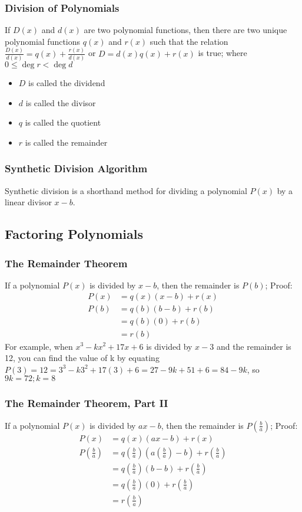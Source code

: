 \documentclass{article}
\begin{document}
	\subsubsection{Division of Polynomials}
	If $D(x)$ and $d(x)$ are two polynomial functions, then there are two unique polynomial functions $q(x)$ and $r(x)$ such that the relation $\frac{D(x)}{d(x)}=q(x)+\frac{r(x)}{d(x)}$ or $D=d(x)q(x)+r(x)$ is true; where $0\leq\deg r<\deg d$
	\begin{itemize}
		\item $D$ is called the dividend
		\item $d$ is called the divisor
		\item $q$ is called the quotient
		\item $r$ is called the remainder
	\end{itemize}
	\subsubsection{Synthetic Division Algorithm}
	Synthetic division is a shorthand method for dividing a polynomial $P(x)$ by a linear divisor $x-b$.
	\subsection{Factoring Polynomials}
	\subsubsection{The Remainder Theorem}
	If a polynomial $P(x)$ is divided by $x-b$, then the remainder is $P(b)$; Proof:
	\begin{align*}
		P(x)&=q(x)(x-b)+r(x)\\
		P(b)&=q(b)(b-b)+r(b)\\
		&=q(b)(0)+r(b)\\
		&=r(b)
	\end{align*}
	For example, when $x^3-kx^2+17x+6$ is divided by $x-3$ and the remainder is 12, you can find the value of k by equating $P(3)=12=3^3-k3^2+17(3)+6=27-9k+51+6=84-9k$, so $9k=72; k=8$
	\subsubsection{The Remainder Theorem, Part II}
	If a polynomial $P(x)$ is divided by $ax-b$, then the remainder is $P(\frac{b}{a})$; Proof:
	\begin{align*}
		P(x)&=q(x)(ax-b)+r(x)\\
		P\left(\frac{b}{a}\right)&=q\left(\frac{b}{a}\right)\left(a\left(\frac{b}{a}\right)-b\right)+r\left(\frac{b}{a}\right)\\
		&=q\left(\frac{b}{a}\right)\left(b-b\right)+r\left(\frac{b}{a}\right)\\
		&=q\left(\frac{b}{a}\right)\left(0\right)+r\left(\frac{b}{a}\right)\\
		&=r\left(\frac{b}{a}\right)
	\end{align*}
\end{document}
